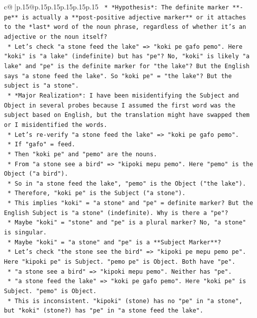 \documentclass{article}
\begin{document}
{\begin{supertabular}{c@{$\;$}|p{.15\linewidth}@{}p{.15\linewidth}p{.15\linewidth}p{.15\linewidth}p{.15\linewidth}p{.15\linewidth}}
{{{\texttt{    *   *Hypothesis*: The definite marker **{-}pe** is actually a **post{-}positive adjective marker** or it attaches to the *last* word of the noun phrase, regardless of whether it's an adjective or the noun itself?} \\
\texttt{    *   Let's check "a stone feed the lake" => "koki pe gafo pemo". Here "koki" is "a lake" (indefinite) but has "pe"? No, "koki" is likely "a lake" and "pe" is the definite marker for "the lake"? But the English says "a stone feed the lake". So "koki pe" = "the lake"? But the subject is "a stone".} \\
\texttt{    *   *Major Realization*: I have been misidentifying the Subject and Object in several probes because I assumed the first word was the subject based on English, but the translation might have swapped them or I misidentified the words.} \\
\texttt{    *   Let's re{-}verify "a stone feed the lake" => "koki pe gafo pemo".} \\
\texttt{        *   If "gafo" = feed.} \\
\texttt{        *   Then "koki pe" and "pemo" are the nouns.} \\
\texttt{        *   From "a stone see a bird" => "kipoki mepu pemo". Here "pemo" is the Object ("a bird").} \\
\texttt{        *   So in "a stone feed the lake", "pemo" is the Object ("the lake").} \\
\texttt{        *   Therefore, "koki pe" is the Subject ("a stone").} \\
\texttt{        *   This implies "koki" = "a stone" and "pe" = definite marker? But the English Subject is "a stone" (indefinite). Why is there a "pe"?} \\
\texttt{        *   Maybe "koki" = "stone" and "pe" is a plural marker? No, "a stone" is singular.} \\
\texttt{        *   Maybe "koki" = "a stone" and "pe" is a **Subject Marker**?} \\
\texttt{        *   Let's check "the stone see the bird" => "kipoki pe mepu pemo pe". Here "kipoki pe" is Subject. "pemo pe" is Object. Both have "pe".} \\
\texttt{        *   "a stone see a bird" => "kipoki mepu pemo". Neither has "pe".} \\
\texttt{        *   "a stone feed the lake" => "koki pe gafo pemo". Here "koki pe" is Subject. "pemo" is Object.} \\
\texttt{        *   This is inconsistent. "kipoki" (stone) has no "pe" in "a stone", but "koki" (stone?) has "pe" in "a stone feed the lake".} \\
}}}
\end{supertabular}}
\end{document}
